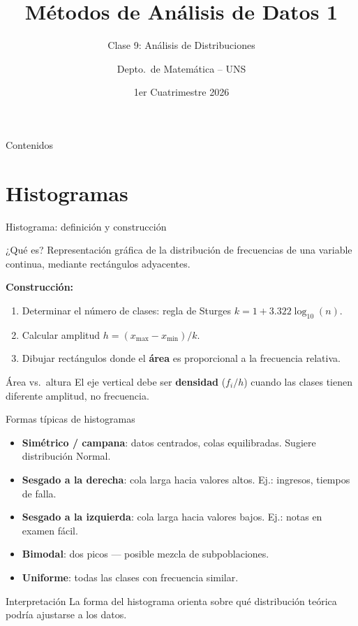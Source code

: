 \documentclass[aspectratio=169]{beamer}
\title{Métodos de Análisis de Datos 1}
\subtitle{Clase 9: Análisis de Distribuciones}
\author{Depto.\ de Matemática -- UNS}
\institute{Universidad Nacional del Sur}
\date{1er Cuatrimestre 2026}
\begin{document}
\begin{frame}
  \titlepage
\end{frame}

\begin{frame}{Contenidos}
  \tableofcontents
\end{frame}

\section{Histogramas}

\begin{frame}{Histograma: definición y construcción}
  \begin{block}{¿Qué es?}
    Representación gráfica de la distribución de frecuencias de una variable continua, mediante rectángulos adyacentes.
  \end{block}
  \bigskip
  \textbf{Construcción:}
  \begin{enumerate}
    \item Determinar el número de clases: regla de Sturges $k = 1 + 3.322\log_{10}(n)$.
    \item Calcular amplitud $h = (x_{\max}-x_{\min})/k$.
    \item Dibujar rectángulos donde el \textbf{área} es proporcional a la frecuencia relativa.
  \end{enumerate}
  \bigskip
  \begin{alertblock}{Área vs.\ altura}
    El eje vertical debe ser \textbf{densidad} ($f_i/h$) cuando las clases tienen diferente amplitud, no frecuencia.
  \end{alertblock}
\end{frame}

\begin{frame}{Formas típicas de histogramas}
  \begin{itemize}
    \item \textbf{Simétrico / campana}: datos centrados, colas equilibradas. Sugiere distribución Normal.
    \item \textbf{Sesgado a la derecha}: cola larga hacia valores altos. Ej.: ingresos, tiempos de falla.
    \item \textbf{Sesgado a la izquierda}: cola larga hacia valores bajos. Ej.: notas en examen fácil.
    \item \textbf{Bimodal}: dos picos — posible mezcla de subpoblaciones.
    \item \textbf{Uniforme}: todas las clases con frecuencia similar.
  \end{itemize}
  \bigskip
  \begin{exampleblock}{Interpretación}
    La forma del histograma orienta sobre qué distribución teórica podría ajustarse a los datos.
  \end{exampleblock}
\end{frame}
\end{document}
